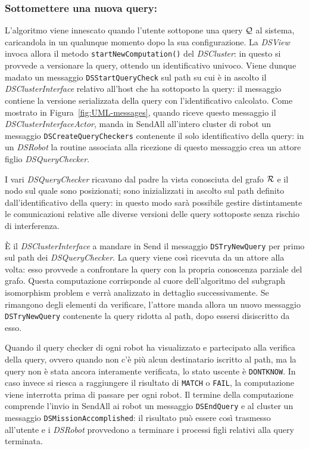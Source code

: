 \subsubsection*{Sottomettere una nuova query:}
L'algoritmo viene innescato quando l'utente sottopone una query $\mathcal{Q}$
al sistema, caricandola in un qualunque momento
dopo la sua configurazione. La \emph{DSView} invoca allora
il metodo \texttt{startNewComputation()} del \emph{DSCluster}:
in questo si provvede a versionare la query,
ottendo un identificativo univoco.
Viene dunque madato un messaggio
\texttt{DSStartQueryCheck} sul path su cui è in ascolto
il \emph{DSClusterInterface} relativo all'host che ha sottoposto
la query: il messaggio contiene la versione serializzata
della query con l'identificativo calcolato.
Come mostrato in Figura~\ref{fig:UML-messages},
quando riceve questo messaggio il \emph{DSClusterInterfaceActor},
manda in SendAll all'intero cluster di robot un messaggio
\texttt{DSCreateQueryCheckers} contenente il solo identificativo della
query: in un \emph{DSRobot} la routine associata alla ricezione
di questo messaggio crea un attore figlio \emph{DSQueryChecker}.

I vari \emph{DSQueryChecker} ricavano dal padre la vista
conosciuta del grafo $\mathcal{R}$ e il nodo sul quale sono posizionati;
sono inizializzati in ascolto sul path definito dall'identificativo
della query: in questo modo sarà possibile gestire
distintamente le comunicazioni relative alle diverse versioni delle
query sottoposte senza rischio di interferenza.

\`E il \emph{DSClusterInterface} a mandare in Send
il messaggio \texttt{DSTryNewQuery} per primo
sul path dei \emph{DSQueryChecker}.
La query viene così ricevuta da un attore alla volta: esso provvede
a confrontare la query con la propria conoscenza parziale del grafo.
Questa computazione corrisponde al cuore dell'algoritmo del
subgraph isomorphism problem e verrà analizzato in dettaglio
successivamente.
Se rimangono degli elementi da verificare, l'attore manda allora
un nuovo messaggio \texttt{DSTryNewQuery} contenente la query ridotta
al path, dopo essersi disiscritto da esso.

Quando il query checker di ogni robot ha visualizzato e partecipato
alla verifica della query, ovvero quando non c'è più alcun destinatario
iscritto al path, ma la query non è stata ancora interamente verificata,
lo stato uscente è \texttt{DONTKNOW}.
In caso invece si riesca a raggiungere il risultato di \texttt{MATCH}
o \texttt{FAIL}, la computazione viene interrotta prima di passare
per ogni robot. Il termine della computazione comprende l'invio
in SendAll ai robot un messaggio \texttt{DSEndQuery} e al cluster
un messaggio \texttt{DSMissionAccomplished}:
il risultato può essere così trasmesso all'utente e i \emph{DSRobot}
provvedono a terminare i processi figli relativi alla query terminata.

